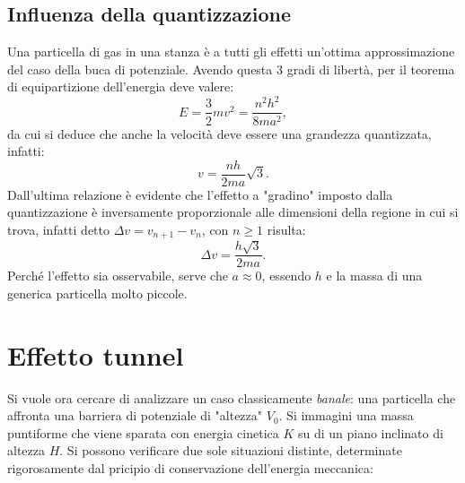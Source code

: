 \documentclass[a4paper,11pt]{report}
\begin{document}
\subsection{Influenza della quantizzazione}
Una particella di gas in una stanza è a tutti gli effetti un'ottima approssimazione del caso della buca di potenziale. Avendo questa 3 gradi di libertà, per il teorema di equipartizione dell'energia deve valere:
\begin{equation}
 E = \frac{3}{2}mv^2 = \frac{n^2h^2}{8ma^2},
\end{equation}
da cui si deduce che anche la velocità deve essere una grandezza quantizzata, infatti:
\begin{equation}
v = \frac{nh}{2ma}\sqrt{3}.
\end{equation}
Dall'ultima relazione è evidente che l'effetto a "gradino" imposto dalla quantizzazione è inversamente proporzionale alle dimensioni della regione in cui si trova, infatti detto $\Delta v = v_{n+1} - v_{n}$, con $n \geq 1$ risulta:
\begin{equation}
\Delta v = \frac{h\sqrt{3}}{2ma}.
\end{equation}
Perché l'effetto sia osservabile, serve che $a \approx 0$, essendo $h$ e la massa di una generica particella molto piccole. 



\section{Effetto tunnel}
Si vuole ora cercare di analizzare un caso classicamente \textit{banale}: una particella che affronta una barriera di potenziale di "altezza" $V_0$. Si immagini una massa puntiforme che viene sparata con energia cinetica $K$ su di un piano inclinato di altezza $H$. Si possono verificare due sole situazioni distinte, determinate rigorosamente dal pricipio di conservazione dell'energia meccanica:
\end{document}
